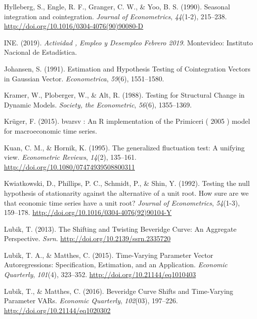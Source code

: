 \documentclass[12pt,oneside]{reedthesis}
\begin{document}
\leavevmode\hypertarget{ref-hegy1990}{}%
Hylleberg, S., Engle, R. F., Granger, C. W., \& Yoo, B. S. (1990). Seasonal integration and cointegration. \emph{Journal of Econometrics}, \emph{44}(1-2), 215--238. \url{http://doi.org/10.1016/0304-4076(90)90080-D}

\leavevmode\hypertarget{ref-INE2019}{}%
INE. (2019). \emph{Actividad , Empleo y Desempleo Febrero 2019}. Montevideo: Instituto Nacional de Estadística.

\leavevmode\hypertarget{ref-Johansen1991}{}%
Johansen, S. (1991). Estimation and Hypothesis Testing of Cointegration Vectors in Gaussian Vector. \emph{Econometrica}, \emph{59}(6), 1551--1580.

\leavevmode\hypertarget{ref-Society1988}{}%
Kramer, W., Ploberger, W., \& Alt, R. (1988). Testing for Structural Change in Dynamic Models. \emph{Society, the Econometric}, \emph{56}(6), 1355--1369.

\leavevmode\hypertarget{ref-Kruger2015}{}%
Krüger, F. (2015). bvarsv : An R implementation of the Primiceri ( 2005 ) model for macroeconomic time series.

\leavevmode\hypertarget{ref-Kuan1995}{}%
Kuan, C. M., \& Hornik, K. (1995). The generalized fluctuation test: A unifying view. \emph{Econometric Reviews}, \emph{14}(2), 135--161. \url{http://doi.org/10.1080/07474939508800311}

\leavevmode\hypertarget{ref-KPSS1992}{}%
Kwiatkowski, D., Phillips, P. C., Schmidt, P., \& Shin, Y. (1992). Testing the null hypothesis of stationarity against the alternative of a unit root. How sure are we that economic time series have a unit root? \emph{Journal of Econometrics}, \emph{54}(1-3), 159--178. \url{http://doi.org/10.1016/0304-4076(92)90104-Y}

\leavevmode\hypertarget{ref-Lubik2013}{}%
Lubik, T. (2013). The Shifting and Twisting Beveridge Curve: An Aggregate Perspective. \emph{Ssrn}. \url{http://doi.org/10.2139/ssrn.2335720}

\leavevmode\hypertarget{ref-Lubik2016b}{}%
Lubik, T. A., \& Matthes, C. (2015). Time-Varying Parameter Vector Autoregressions: Specification, Estimation, and an Application. \emph{Economic Quarterly}, \emph{101}(4), 323--352. \url{http://doi.org/10.21144/eq1010403}

\leavevmode\hypertarget{ref-Lubik2016}{}%
Lubik, T., \& Matthes, C. (2016). Beveridge Curve Shifts and Time-Varying Parameter VARs. \emph{Economic Quarterly}, \emph{102}(03), 197--226. \url{http://doi.org/10.21144/eq1020302}
\end{document}
